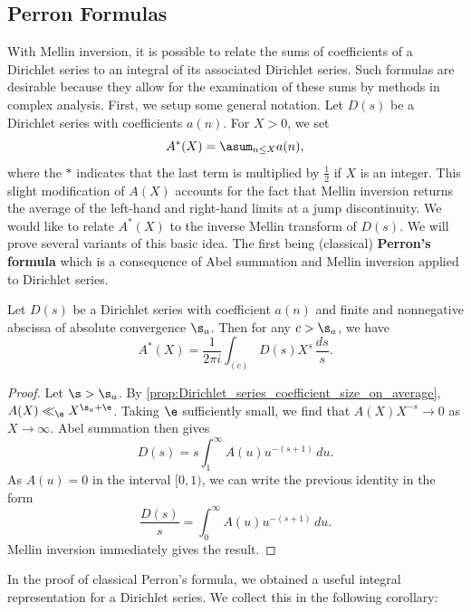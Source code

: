 \documentclass[12pt]{article}
\begin{document}
    \subsection{Perron Formulas}
      With Mellin inversion, it is possible to relate the sums of coefficients of a Dirichlet series to an integral of its associated Dirichlet series. Such formulas are desirable because they allow for the examination of these sums by methods in complex analysis. First, we setup some general notation. Let \(D(s)\) be a Dirichlet series with coefficients \(a(n)\). For \(X > 0\), we set
      \[
        A^{\ast}(X) = \asum_{n \le X}a(n),
      \]
      where the \(\ast\) indicates that the last term is multiplied by \(\frac{1}{2}\) if \(X\) is an integer. This slight modification of \(A(X)\) accounts for the fact that Mellin inversion returns the average of the left-hand and right-hand limits at a jump discontinuity. We would like to relate \(A^{\ast}(X)\) to the inverse Mellin transform of \(D(s)\). We will prove several variants of this basic idea. The first being (classical) \textbf{Perron's formula} which is a consequence of Abel summation and Mellin inversion applied to Dirichlet series.

      \begin{theorem*}
        Let \(D(s)\) be a Dirichlet series with coefficient \(a(n)\) and finite and nonnegative abscissa of absolute convergence \(\s_{a}\). Then for any \(c > \s_{a}\), we have
        \[
          A^{\ast}(X) = \frac{1}{2\pi i}\int_{(c)}D(s)X^{s}\,\frac{ds}{s}.
        \]
      \end{theorem*}
      \begin{proof}
        Let \(\s > \s_{a}\). By \cref{prop:Dirichlet_series_coefficient_size_on_average}, \(A(X) \ll_{\e} X^{\s_{a}+\e}\). Taking \(\e\) sufficiently small, we find that \(A(X)X^{-s} \to 0\) as \(X \to \infty\). Abel summation then gives
        \begin{equation}\label{equ:integral_rep_for_Dirichlet_series}
          D(s) = s\int_{1}^{\infty}A(u)u^{-(s+1)}\,du.
        \end{equation}
        As \(A(u) = 0\) in the interval \([0,1)\), we can write the previous identity in the form
        \[
          \frac{D(s)}{s} = \int_{0}^{\infty}A(u)u^{-(s+1)}\,du.
        \]
        Mellin inversion immediately gives the result.
      \end{proof}

      In the proof of classical Perron's formula, we obtained a useful integral representation for a Dirichlet series. We collect this in the following corollary:
\end{document}
